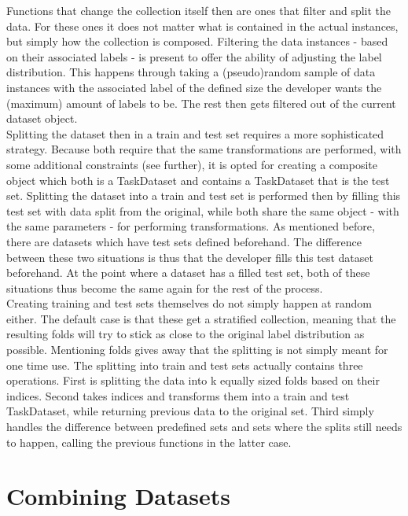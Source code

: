 Functions that change the collection itself then are ones that filter and split the data. For these ones it does not matter what is contained in the actual instances, but simply how the collection is composed. Filtering the data instances - based on their associated labels - is present to offer the ability of adjusting the label distribution. This happens through taking a (pseudo)random sample of data instances with the associated label of the defined size the developer wants the (maximum) amount of labels to be. The rest then gets filtered out of the current dataset object. \\

Splitting the dataset then in a train and test set requires a more sophisticated strategy. Because both require that the same transformations are performed, with some additional constraints (see further), it is opted for creating a composite object which both is a TaskDataset and contains a TaskDataset that is the test set. Splitting the dataset into a train and test set is performed then by filling this test set with data split from the original, while both share the same object - with the same parameters - for performing transformations. As mentioned before, there are datasets which have test sets defined beforehand. The difference between these two situations is thus that the developer fills this test dataset beforehand. At the point where a dataset has a filled test set, both of these situations thus become the same again for the rest of the process. \\

Creating training and test sets themselves do not simply happen at random either. The default case is that these get a stratified collection, meaning that the resulting folds will try to stick as close to the original label distribution as possible. Mentioning folds gives away that the splitting is not simply meant for one time use. The splitting into train and test sets actually contains three operations. First is splitting the data into k equally sized folds based on their indices. Second takes indices and transforms them into a train and test TaskDataset, while returning previous data to the original set. Third simply handles the difference between predefined sets and sets where the splits still needs to happen, calling the previous functions in the latter case. \\



\section{Combining Datasets} \label{Design:Combining}

